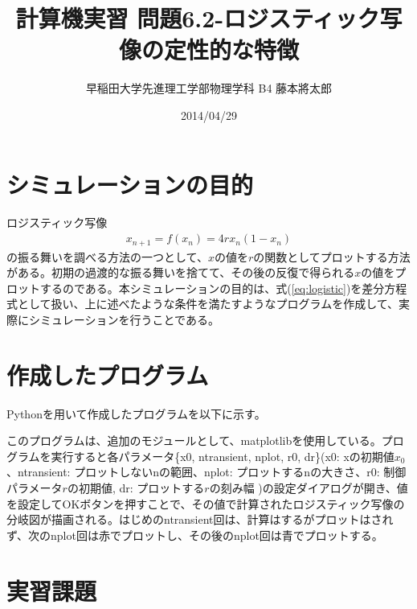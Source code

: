 \documentclass{jsarticle}
\title{計算機実習 問題6.2-ロジスティック写像の定性的な特徴}
\author{早稲田大学先進理工学部物理学科 B4 藤本將太郎}
\date{2014/04/29}
\begin{document}
\maketitle

\section{シミュレーションの目的}
ロジスティック写像
\begin{eqnarray}
 x_{n+1}=f(x_{n})=4rx_{n}(1-x_{n})
\label{eq:logistic}
\end{eqnarray}
の振る舞いを調べる方法の一つとして、$x$の値を$r$の関数としてプロットする方法がある。初期の過渡的な振る舞いを捨てて、その後の反復で得られる$x$の値をプロットするのである。本シミュレーションの目的は、式(\ref{eq:logistic})を差分方程式として扱い、上に述べたような条件を満たすようなプログラムを作成して、実際にシミュレーションを行うことである。

\section{作成したプログラム}
Pythonを用いて作成したプログラムを以下に示す。


このプログラムは、追加のモジュールとして、matplotlibを使用している。プログラムを実行すると各パラメータ\{x0, ntransient, nplot, r0, dr\}(x0: xの初期値$x_{0}$、ntransient: プロットしないnの範囲、nplot: プロットするnの大きさ、r0: 制御パラメータ$r$の初期値, dr: プロットする$r$の刻み幅 )の設定ダイアログが開き、値を設定してOKボタンを押すことで、その値で計算されたロジスティック写像の分岐図が描画される。はじめのntransient回は、計算はするがプロットはされず、次のnplot回は赤でプロットし、その後のnplot回は青でプロットする。

\section{実習課題}
\end{document}
